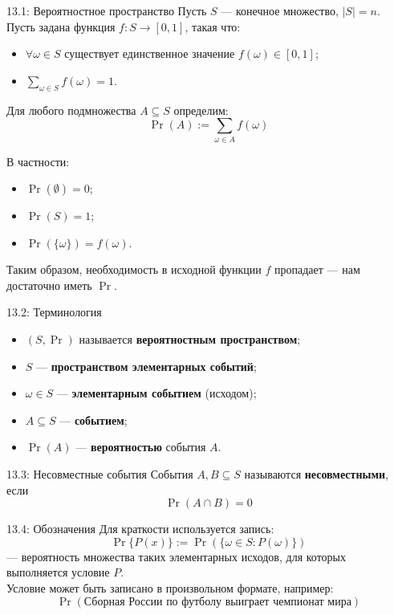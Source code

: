 \documentclass[a4paper,12pt]{article}
\begin{document}
	\begin{definitionbox}{13.1: Вероятностное пространство}
		Пусть \(S\) — конечное множество, \(|S| = n\). Пусть задана функция \(f: S \to [0,1]\), такая что:
		\begin{itemize}
			\item \(\forall \omega \in S\) существует единственное значение \(f(\omega) \in [0,1]\);
			\item \(\sum_{\omega \in S} f(\omega) = 1\).
		\end{itemize}
		
		Для любого подмножества \(A \subseteq S\) определим:
		\[ \Pr(A) := \sum_{\omega \in A} f(\omega) \]
		
		В частности:
		\begin{itemize}
			\item \(\Pr(\emptyset) = 0\);
			\item \(\Pr(S) = 1\);
			\item \(\Pr(\{\omega\}) = f(\omega)\).
		\end{itemize}
		
		Таким образом, необходимость в исходной функции \(f\) пропадает — нам достаточно иметь \(\Pr\).
	\end{definitionbox}
	
	\begin{definitionbox}{13.2: Терминология}
		\begin{itemize}
			\item \((S, \Pr)\) называется \textbf{вероятностным пространством};
			\item \(S\) — \textbf{пространством элементарных событий};
			\item \(\omega \in S\) — \textbf{элементарным событием} (исходом);
			\item \(A \subseteq S\) — \textbf{событием};
			\item \(\Pr(A)\) — \textbf{вероятностью} события \(A\).
		\end{itemize}
	\end{definitionbox}
	
	\begin{definitionbox}{13.3: Несовместные события}
		События \(A, B \subseteq S\) называются \textbf{несовместными}, если
		\[ \Pr(A \cap B) = 0 \]
	\end{definitionbox}
	
	\begin{notebook}{13.4: Обозначения}
		Для краткости используется запись:
		\[ \Pr\{P(x)\} := \Pr(\{\omega \in S : P(\omega)\}) \]
		— вероятность множества таких элементарных исходов, для которых выполняется условие \(P\).\\
		
		Условие может быть записано в произвольном формате, например:
		\[ \Pr(\text{Сборная России по футболу выиграет чемпионат мира}) \]
	\end{notebook}
	
\end{document}

